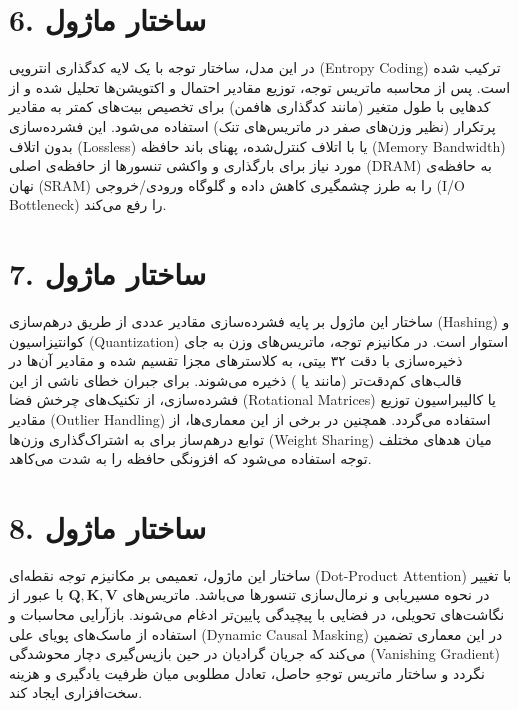 \documentclass[12pt,a4paper]{report}
\begin{document}
\section*{6. ساختار ماژول }
در این مدل، ساختار توجه با یک لایه کدگذاری انتروپی (Entropy Coding) ترکیب شده است. پس از محاسبه ماتریس توجه، توزیع مقادیر احتمال و اکتویشن‌ها تحلیل شده و از کدهایی با طول متغیر (مانند کدگذاری هافمن) برای تخصیص بیت‌های کمتر به مقادیر پرتکرار (نظیر وزن‌های صفر در ماتریس‌های تنک) استفاده می‌شود. این فشرده‌سازی بدون اتلاف (Lossless) یا با اتلاف کنترل‌شده، پهنای باند حافظه (Memory Bandwidth) مورد نیاز برای بارگذاری و واکشی تنسورها از حافظه‌ی اصلی (DRAM) به حافظه‌ی نهان (SRAM) را به طرز چشمگیری کاهش داده و گلوگاه ورودی/خروجی (I/O Bottleneck) را رفع می‌کند.

\section*{7. ساختار ماژول }
ساختار این ماژول بر پایه فشرده‌سازی مقادیر عددی از طریق درهم‌سازی (Hashing) و کوانتیزاسیون (Quantization) استوار است. در مکانیزم توجه، ماتریس‌های وزن به جای ذخیره‌سازی با دقت ۳۲ بیتی، به کلاسترهای مجزا تقسیم شده و مقادیر آن‌ها در قالب‌های کم‌دقت‌تر (مانند  یا ) ذخیره می‌شوند. برای جبران خطای ناشی از این فشرده‌سازی، از تکنیک‌های چرخش فضا (Rotational Matrices) یا کالیبراسیون توزیع مقادیر (Outlier Handling) استفاده می‌گردد. همچنین در برخی از این معماری‌ها، از توابع درهم‌ساز برای به اشتراک‌گذاری وزن‌ها (Weight Sharing) میان هد‌های مختلف توجه استفاده می‌شود که افزونگی حافظه را به شدت می‌کاهد.

\section*{8. ساختار ماژول }
ساختار این ماژول، تعمیمی بر مکانیزم توجه نقطه‌ای (Dot-Product Attention) با تغییر در نحوه مسیریابی و نرمال‌سازی تنسورها می‌باشد. ماتریس‌های $\mathbf{Q, K, V}$ با عبور از نگاشت‌های تحویلی، در فضایی با پیچیدگی پایین‌تر ادغام می‌شوند. بازآرایی محاسبات و استفاده از ماسک‌های پویای علی (Dynamic Causal Masking) در این معماری تضمین می‌کند که جریان گرادیان در حین بازپس‌گیری دچار محوشدگی (Vanishing Gradient) نگردد و ساختار ماتریس توجهِ حاصل، تعادل مطلوبی میان ظرفیت یادگیری و هزینه سخت‌افزاری ایجاد کند.
\end{document}
